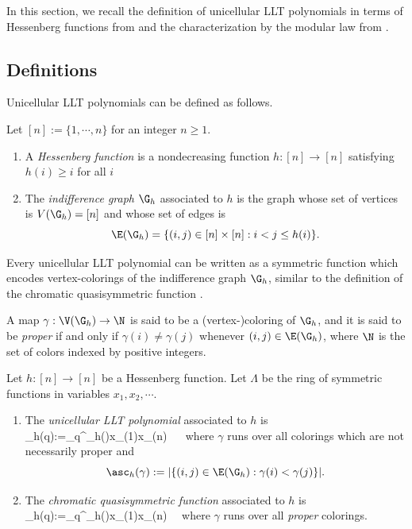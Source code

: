 In this section, we recall the definition of unicellular LLT polynomials in terms of Hessenberg functions from \cite{CM} and the characterization by the modular law from \cite{AN2}. 
\subsection{Definitions}\label{n1}
Unicellular LLT polynomials can be defined as follows. 
\begin{definition}
	Let $[n]:=\{1,\cdots, n\}$ for an integer $n\geq1$.
	\begin{enumerate}
		\item A \emph{Hessenberg function} is a nondecreasing function $h:[n]\to[n]$ satisfying $h(i)\geq i $ for all $i$
		\item The  \emph{indifference graph} $\G_h$ associated to $h$ is the graph whose  set of vertices is $V(\G_h)=[n]$ and whose set of edges is
			\[\E(\G_h)=\{(i,j)\in [n]\times [n]:i<j\leq h(i)\}.\]
	\end{enumerate}
\end{definition}

Every unicellular LLT polynomial can be written as a symmetric function which encodes vertex-colorings of the indifference graph $\G_h$, similar to the definition of the chromatic quasisymmetric function \cite{Sta,SW}.

A map $\gamma:\V(\G_h)\to \N$ is said to be a (vertex-)coloring of $\G_h$, and it is said to be \emph{proper} if and only if $\gamma(i)\neq \gamma(j)$ whenever $(i,j)\in \E(\G_h)$, where $\N$ is the set of colors indexed by  positive integers.

\begin{definition}\label{n2} \cite{CM, Sta, SW}
	Let $h:[n]\to [n]$ be a Hessenberg function. Let $\Lambda$ be the ring of symmetric functions in variables  $x_1,x_2,\cdots$.

	\begin{enumerate}
	\item The \emph{unicellular LLT polynomial} associated to $h$ is 
	\beq\label{n12}
	\LLT_h(q):=\sum_{}q^{\asc_h(\gamma)}x_{\gamma(1)}\cdots x_{\gamma(n)} \ \ \in \Lambda[q]\eeq
	where $\gamma$ runs over all colorings which are not necessarily proper and 
	\[\asc_h(\gamma):=\lvert\{(i,j)\in \E(\G_h):\gamma(i)<\gamma(j)\}\rvert.\]
	\item  The \emph{chromatic quasisymmetric function} associated to $h$ is 
	\beq\label{n11} 
	\csf_h(q):=\sum_{}q^{\asc_h(\gamma)}x_{\gamma(1)}\cdots x_{\gamma(n)}\ \ \in \Lambda[q]\eeq
	where $\gamma$ runs over all \emph{proper} colorings.
	\end{enumerate}
\end{definition} 




